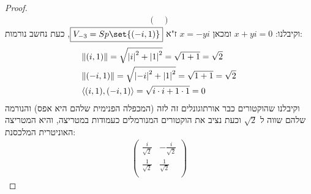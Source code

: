 \documentclass{article}
\DeclarePairedDelimiter\set\{\}
\begin{document}
\begin{enumerate}
\begin{proof}
\begin{align*}
\begin{pmatrix}
				\end{pmatrix}
			\end{align*}
			וקיבלנו: $x + yi = 0$ ומכאן $x = -yi$ ז"א $\boxed{V_{-3} = Sp\set{(-i, 1)}}$, כעת נחשב נורמות:
			\begin{align*}
				&\lVert (i, 1) \rVert = \sqrt{\left| i \right|^2 + \left| 1 \right|^2} = \sqrt{1 + 1} = \sqrt{2} \\
				&\lVert (-i, 1) \rVert = \sqrt{\left| -i \right|^2 + \left| 1 \right|^2} = \sqrt{1 + 1} = \sqrt{2} \\
				&\langle (i, 1), (-i, 1) \rangle = \sqrt{i \cdot i + 1 \cdot 1} = 0
			\end{align*}
			וקיבלנו שהוקטורים כבר אורתוגונלים זה לזה (המכפלה הפנימית שלהם היא אפס) והנורמה שלהם שווה ל $\sqrt{2}$ וכעת נציב את הוקטורים המנורמלים כעמודות במטריצה, והיא המטריצה האוניטרית המלכסנת:
			\begin{align*}
				\boxed{
					\begin{pmatrix}
						\frac{i}{\sqrt{2}} & - \frac{i}{\sqrt{2}} \\
						\frac{1}{\sqrt{2}} & \frac{1}{\sqrt{2}} \\
					\end{pmatrix}
				}
			\end{align*}
		\end{proof}


\end{enumerate}
\end{document}
